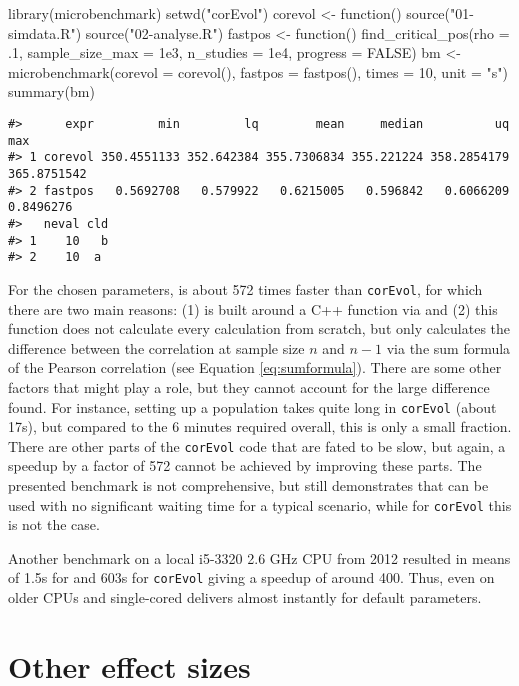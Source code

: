 \begin{Schunk}
\begin{Sinput}
library(microbenchmark)
setwd("corEvol")
corevol <- function() {
  source("01-simdata.R")
  source("02-analyse.R")
}
fastpos <- function() {
  find_critical_pos(rho = .1, sample_size_max = 1e3, n_studies = 1e4,
                    progress = FALSE)
}
bm <- microbenchmark(corevol = corevol(), fastpos = fastpos(), times = 10,
                     unit = "s")
summary(bm)
\end{Sinput}
\end{Schunk}

\begin{verbatim}
#>      expr         min         lq        mean     median          uq         max
#> 1 corevol 350.4551133 352.642384 355.7306834 355.221224 358.2854179 365.8751542
#> 2 fastpos   0.5692708   0.579922   0.6215005   0.596842   0.6066209   0.8496276
#>   neval cld
#> 1    10   b
#> 2    10  a
\end{verbatim}

For the chosen parameters,  is about 572 times faster than \texttt{corEvol}, for which there are two main reasons: (1)  is built around a C++ function via  and (2) this function does not calculate every calculation from scratch, but only calculates the difference between the correlation at sample size \(n\) and \(n-1\) via the sum formula of the Pearson correlation (see Equation \eqref{eq:sumformula}). There are some other factors that might play a role, but they cannot account for the large difference found. For instance, setting up a population takes quite long in \texttt{corEvol} (about 17s), but compared to the 6 minutes required overall, this is only a small fraction. There are other parts of the \texttt{corEvol} code that are fated to be slow, but again, a speedup by a factor of 572 cannot be achieved by improving these parts. The presented benchmark is not comprehensive, but still demonstrates that  can be used with no significant waiting time for a typical scenario, while for \texttt{corEvol} this is not the case.

Another benchmark on a local i5-3320 2.6 GHz CPU from 2012 resulted in means of 1.5s for  and 603s for \texttt{corEvol} giving a speedup of around 400. Thus, even on older CPUs and single-cored  delivers almost instantly for default parameters.

\hypertarget{other-effect-sizes}{%
\section{Other effect sizes}\label{other-effect-sizes}}

